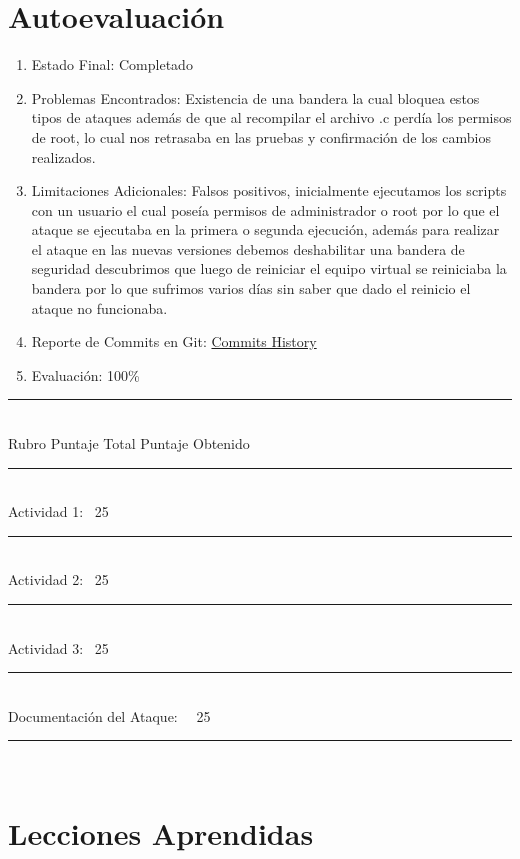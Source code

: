 \documentclass{article}
\begin{document}
\section*{Autoevaluación}

\begin{enumerate}
    \item Estado Final: Completado
    \item Problemas Encontrados: Existencia de una bandera la cual bloquea estos tipos de ataques además de que al recompilar el archivo .c perdía los permisos de root, lo cual nos retrasaba en las pruebas y confirmación de los cambios realizados.
    \item Limitaciones Adicionales: Falsos positivos, inicialmente ejecutamos los scripts con un usuario el cual poseía permisos de administrador o root por lo que el ataque se ejecutaba en la primera o segunda ejecución, además para realizar el ataque en las nuevas versiones debemos deshabilitar una bandera de seguridad descubrimos que luego de reiniciar el equipo virtual se reiniciaba la bandera por lo que sufrimos varios días sin saber que dado el reinicio el ataque no funcionaba.
    \item Reporte de Commits en Git: \href{https://github.com/varitomirandacr/SeguridadSO_RaceCondition/commits/main}{Commits History}
    \item Evaluación: 100\%
\end{enumerate}

    \noindent\rule{10cm}{0.4pt} \\
    Rubro   \qquad \qquad \qquad \qquad Puntaje Total    \qquad  Puntaje Obtenido \\
    \noindent\rule{10cm}{0.4pt} \\
    Actividad 1: \qquad \qquad \qquad \qquad \ 25 \qquad \qquad {}\\ 
    \noindent\rule{10cm}{0.1pt} \\
    Actividad 2: \qquad \qquad \qquad \qquad \ 25 \qquad \qquad {}\\ 
    \noindent\rule{10cm}{0.1pt} \\
    Actividad 3: \qquad \qquad \qquad \qquad \ 25 \qquad \qquad {}\\ 
    \noindent\rule{10cm}{0.1pt} \\
    Documentación del Ataque: \quad \ \ 25 \qquad \qquad {}\\ 
    \noindent\rule{10cm}{0.1pt} \\

\section*{Lecciones Aprendidas}
\end{document}

